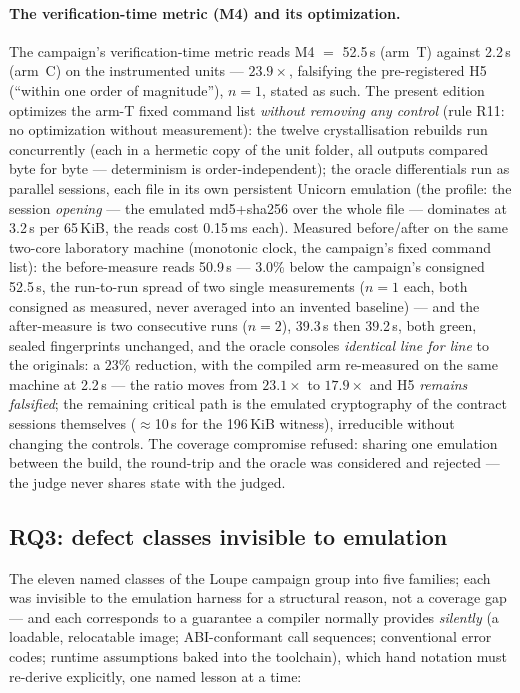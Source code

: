 \documentclass[10pt,a4paper]{article}
\begin{document}
\paragraph{The verification-time metric (M4) and its optimization.}
The campaign's verification-time metric reads M4 $=$ 52.5\,s (arm~T)
against 2.2\,s (arm~C) on the instrumented units --- $23.9\times$,
falsifying the pre-registered H5 (``within one order of magnitude''),
$n{=}1$, stated as such. The present edition optimizes the arm-T
fixed command list \emph{without removing any control} (rule R11: no
optimization without measurement): the twelve crystallisation rebuilds
run concurrently (each in a hermetic copy of the unit folder, all
outputs compared byte for byte --- determinism is order-independent);
the oracle differentials run as parallel sessions, each file in its own
persistent Unicorn emulation (the profile: the session \emph{opening}
--- the emulated md5+sha256 over the whole file --- dominates at
3.2\,s per 65\,KiB, the reads cost 0.15\,ms each). Measured
before/after on the same two-core laboratory machine (monotonic clock,
the campaign's fixed command list): the before-measure reads 50.9\,s
--- 3.0\% below the campaign's consigned 52.5\,s, the run-to-run
spread of two single measurements ($n{=}1$ each, both consigned as
measured, never averaged into an invented baseline) --- and the
after-measure is two consecutive runs ($n{=}2$), 39.3\,s then
39.2\,s, both green, sealed fingerprints unchanged, and the oracle
consoles \emph{identical line for line} to the originals: a $23\%$
reduction, with
the compiled arm re-measured on the same machine at 2.2\,s --- the
ratio moves from $23.1\times$ to $17.9\times$ and H5 \emph{remains
falsified}; the remaining critical path is the emulated cryptography of
the contract sessions themselves ($\approx$10\,s for the 196\,KiB
witness), irreducible without changing the controls. The coverage
compromise refused: sharing one emulation between the build, the
round-trip and the oracle was considered and rejected --- the judge
never shares state with the judged.

\subsection{RQ3: defect classes invisible to emulation}\label{sec:rq3}

The eleven named classes of the Loupe campaign group into five families;
each was invisible to the emulation harness for a structural reason, not
a coverage gap --- and each corresponds to a guarantee a compiler
normally provides \emph{silently} (a loadable, relocatable image;
ABI-conformant call sequences; conventional error codes; runtime
assumptions baked into the toolchain), which hand notation must
re-derive explicitly, one named lesson at a time:
\end{document}
